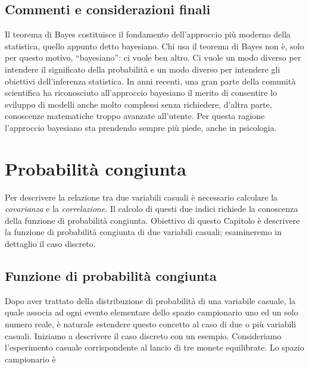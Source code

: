 \documentclass[
  11pt,
]{krantz}
\theoremstyle{definition}
\theoremstyle{definition}
\theoremstyle{definition}
\theoremstyle{definition}
\theoremstyle{remark}
\begin{document}
\hypertarget{commenti-e-considerazioni-finali-2}{%
\section*{Commenti e considerazioni finali}\label{commenti-e-considerazioni-finali-2}}


Il teorema di Bayes costituisce il fondamento dell'approccio più moderno della statistica, quello appunto detto bayesiano. Chi usa il teorema di Bayes non è, solo per questo motivo, ``bayesiano'': ci vuole ben altro. Ci vuole un modo diverso per intendere il significato della probabilità e un modo diverso per intendere gli obiettivi dell'inferenza statistica. In anni recenti, una gran parte della comunità scientifica ha riconosciuto all'approccio bayesiano il merito di consentire lo sviluppo di modelli anche molto complessi senza richiedere, d'altra parte, conoscenze matematiche troppo avanzate all'utente. Per questa ragione l'approccio bayesiano sta prendendo sempre più piede, anche in psicologia.

\hypertarget{chapter-prob-congiunta}{%
\chapter{Probabilità congiunta}\label{chapter-prob-congiunta}}

Per descrivere la relazione tra due variabili casuali è necessario calcolare la \emph{covarianza} e la \emph{correlazione}. Il calcolo di questi due indici richiede la conoscenza della funzione di probabilità congiunta. Obiettivo di questo Capitolo è descrivere la funzione di probabilità congiunta di due variabili casuali; esamineremo in dettaglio il caso discreto.

\hypertarget{funzione-di-probabilituxe0-congiunta}{%
\section{Funzione di probabilità congiunta}\label{funzione-di-probabilituxe0-congiunta}}

Dopo aver trattato della distribuzione di probabilità di una variabile casuale, la quale associa ad ogni evento elementare dello spazio campionario uno ed un solo numero reale, è naturale estendere questo concetto al caso di due o più variabili casuali. Iniziamo a descrivere il caso discreto con un esempio. Consideriamo l'esperimento casuale corrispondente al lancio di tre monete equilibrate. Lo spazio campionario è
\end{document}
